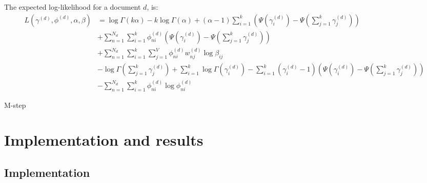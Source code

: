 \documentclass{article}
\begin{document}
The expected log-likelihood for a document $d$, is:
\begin{align*}
L(\gamma^{(d)}, \phi^{(d)}, \alpha, \beta)
& = \log \Gamma\left( k\alpha \right) - k \log \Gamma(\alpha) + (\alpha - 1)  \sum_{i=1}^k \left( \Psi(\gamma_i^{(d)}) - \Psi\left( \sum_{j=1}^k \gamma_j^{(d)} \right) \right) \\
&+ \sum_{n=1}^{N_d} \sum_{i=1}^k \phi_{ni}^{(d)} \left( \Psi(\gamma_i^{(d)}) - \Psi\left( \sum_{j=1}^k \gamma_j^{(d)} \right) \right) \\
&+ \sum_{n=1}^{N_d} \sum_{i=1}^k \sum_{j=1}^V \phi_{ni}^{(d)} w_{nj}^{(d)} \log \beta_{ij} \\
& - \log \Gamma \left( \sum_{j=1}^k \gamma_j^{(d)} \right) + \sum_{i=1}^k \log \Gamma(\gamma_i^{(d)}) - \sum_{i=1}^k(\gamma_i^{(d)} - 1) \left( \Psi(\gamma_i^{(d)}) - \Psi\left( \sum_{j=1}^k \gamma_j^{(d)} \right)\right) \\
&- \sum_{n=1}^{N_d} \sum_{i=1}^k \phi_{ni}^{(d)}\log\phi_{ni}^{(d)} 
\end{align*}


\begin{algorithm}
\caption{M-step}
\end{algorithm}

\section{Implementation and results}
\subsection{Implementation}
\end{document}
